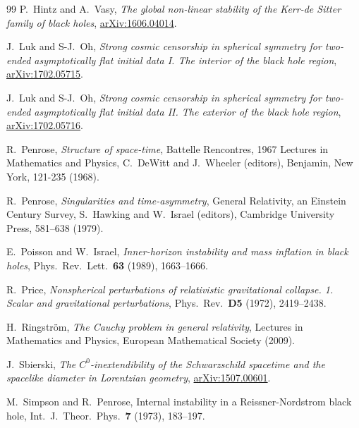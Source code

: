 \documentclass[a4paper,11pt,oneside,reqno]{amsart}
\begin{document}
\begin{thebibliography}{99}
P.~Hintz and A.~Vasy, \emph{The global non-linear stability of the Kerr-de Sitter family of black holes}, \href{http://arxiv.org/abs/1606.04014}{arXiv:1606.04014}.
  
{J.~Luk and S-J.~Oh}, \emph{Strong cosmic censorship in spherical symmetry for two-ended asymptotically flat initial data I. The interior of the black hole region}, \href{http://arxiv.org/abs/1702.05715}{arXiv:1702.05715}.

{J.~Luk and S-J.~Oh}, \emph{Strong cosmic censorship in spherical symmetry for two-ended asymptotically flat initial data II. The exterior of the black hole region}, \href{http://arxiv.org/abs/1702.05716}{arXiv:1702.05716}.

R.~Penrose, \emph{{Structure of space-time}}, Battelle Rencontres, 1967 Lectures in Mathematics and Physics, C.~DeWitt and J.~Wheeler (editors), Benjamin, New York, 121-235 (1968).

R.~Penrose, \emph{{Singularities and time-asymmetry}}, General Relativity, an Einstein Century Survey, S.~Hawking and W.~Israel (editors), Cambridge University Press, 581--638 (1979).

E.~Poisson and W.~Israel, \emph{{Inner-horizon instability and mass inflation in black holes}}, Phys.~Rev.~Lett.~\textbf{63} (1989), 1663--1666.

R.~Price, \emph{{Nonspherical perturbations of relativistic gravitational collapse. 1. Scalar and gravitational perturbations}}, Phys.\ Rev.~\textbf{D5} (1972), 2419--2438.

{H.~Ringstr\"om}, \emph{{The Cauchy problem in general relativity}}, Lectures in Mathematics and Physics, European Mathematical Society (2009).

J.~Sbierski, \emph{{The $C^0$-inextendibility of the Schwarzschild spacetime and the spacelike diameter in Lorentzian geometry}}, \href{http://arxiv.org/abs/1507.00601}{arXiv:1507.00601}.

M.~Simpson and R.~Penrose, Internal instability in a Reissner-Nordstrom black hole, Int.\ J.\ Theor.\ Phys.\ \textbf{7} (1973), 183--197.
    
\end{thebibliography}
  
\end{document}
